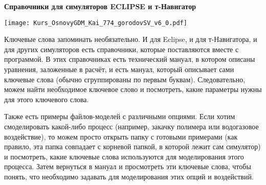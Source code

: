 \textbf{Справочники для симуляторов ECLIPSE и т-Навигатор}

\texttt{[image: Kurs\_OsnovyGDM\_Kai\_774\_gorodovSV\_v6\_0.pdf]}

Ключевые слова запоминать необязательно.
И для Eclipse, и для т-Навигатора, и для других симуляторов есть справочники, которые поставляются вместе с программой.
В этих справочниках есть технический мануал, в котором описаны уравнения, заложенные в расчёт, и есть мануал, который описывает сами ключевые слова (обычно сгруппированы по первым буквам).
Следовательно, можем найти необходимое ключевое слово и посмотреть, какие параметры нужны для этого ключевого слова.

Также есть примеры файлов-моделей с различными опциями.
Если хотим смоделировать какой-либо процесс (например, закачку полимера или водогазовое воздействие), то можем просто открыть папку с готовыми примерами (как правило, эта папка совпадает с корневой папкой, в которой лежит сам симулятор) и посмотреть, какие ключевые слова используются для моделирования этого процесса.
Затем вернуться в мануал и просмотреть эти ключевые слова, чтобы понять, что необходимо задавать для моделирования этих опций и воздействий.


